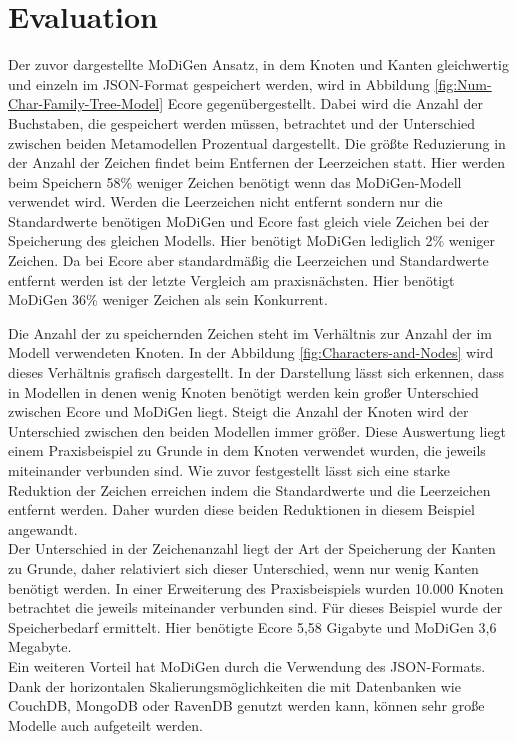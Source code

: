\section{Evaluation} \label{sec:evaluation}
Der zuvor dargestellte MoDiGen Ansatz, in dem Knoten und Kanten gleichwertig und einzeln im JSON-Format gespeichert werden, wird in Abbildung \ref{fig:Num-Char-Family-Tree-Model} Ecore gegenübergestellt. Dabei wird die Anzahl der Buchstaben, die gespeichert werden müssen, betrachtet und der Unterschied zwischen beiden Metamodellen Prozentual dargestellt. Die größte Reduzierung in der Anzahl der Zeichen findet beim Entfernen der Leerzeichen statt. Hier werden beim Speichern 58\% weniger Zeichen benötigt wenn das MoDiGen-Modell verwendet wird. Werden die Leerzeichen nicht entfernt sondern nur die Standardwerte benötigen MoDiGen und Ecore fast gleich viele Zeichen bei der Speicherung des gleichen Modells. Hier benötigt MoDiGen lediglich 2\% weniger Zeichen. Da bei Ecore aber standardmäßig die Leerzeichen und Standardwerte entfernt werden ist der letzte Vergleich am praxisnächsten. Hier benötigt MoDiGen 36\% weniger Zeichen als sein Konkurrent.

Die Anzahl der zu speichernden Zeichen steht im Verhältnis zur Anzahl der im Modell verwendeten Knoten. 
In der Abbildung \ref{fig:Characters-and-Nodes} wird dieses Verhältnis grafisch dargestellt. In der Darstellung lässt sich erkennen, dass in Modellen in denen wenig Knoten benötigt werden kein großer Unterschied zwischen Ecore und MoDiGen liegt. Steigt die Anzahl der Knoten wird der Unterschied zwischen den beiden Modellen immer größer. Diese Auswertung liegt einem Praxisbeispiel zu Grunde in dem Knoten verwendet wurden, die jeweils miteinander verbunden sind. Wie zuvor festgestellt lässt sich eine starke Reduktion der Zeichen erreichen indem die Standardwerte und die Leerzeichen entfernt werden. Daher wurden diese beiden Reduktionen in diesem Beispiel angewandt.\\
Der Unterschied in der Zeichenanzahl liegt der Art der Speicherung der Kanten zu Grunde, daher relativiert sich dieser Unterschied, wenn nur wenig Kanten benötigt werden. In einer Erweiterung des Praxisbeispiels wurden 10.000 Knoten betrachtet die jeweils miteinander verbunden sind. Für dieses Beispiel wurde der Speicherbedarf ermittelt. Hier benötigte Ecore 5,58 Gigabyte und MoDiGen 3,6 Megabyte.\\
Ein weiteren Vorteil hat MoDiGen durch die Verwendung des JSON-Formats. Dank der horizontalen Skalierungsmöglichkeiten die mit Datenbanken wie CouchDB, MongoDB oder RavenDB genutzt werden kann, können sehr große Modelle auch aufgeteilt werden. \\
